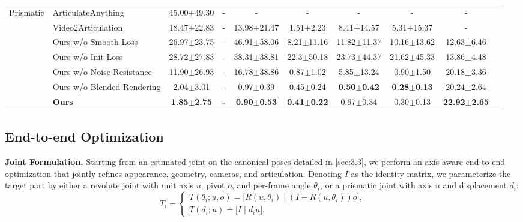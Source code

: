 \begin{table}[t]
{\begin{tabular}{llcccccccc}
    \midrule
    \multirow{6}{*}{\centering Prismatic} 
    & {ArticulateAnything~\cite{articulateanything}} & 45.00$\pm$49.30 & - & - & - & - & - & - \\
    & {Video2Articulation~\cite{video2articulation}} & 18.47$\pm$22.83 & - & 13.98$\pm$21.47 & 1.51$\pm$2.23 & 8.41$\pm$14.57 & 5.31$\pm$15.37 & - \\
    & Ours w/o Smooth Loss & 26.97$\pm$23.75 & - & 46.91$\pm$58.06 & 8.21$\pm$11.16 & 11.82$\pm$11.37 & 10.16$\pm$13.62 & 12.63$\pm$6.46 \\
    & Ours w/o Init Loss & 28.72$\pm$27.83 & - & 38.31$\pm$38.81 & 22.3$\pm$50.18 & 23.73$\pm$44.37 & 21.62$\pm$45.33 & 13.86$\pm$4.48 \\
    & Ours w/o Noise Resistance & 11.90$\pm$26.93 & - & 16.78$\pm$38.86 & 0.87$\pm$1.02 & 5.85$\pm$13.24 & 0.90$\pm$1.50 & 20.18$\pm$3.36 \\
    & Ours w/o Blended Rendering & 2.04$\pm$3.01 & - & 0.97$\pm$0.39 & 0.45$\pm$0.24 & \textbf{0.50$\pm$0.42} & \textbf{0.28$\pm$0.13} & 20.24$\pm$2.64 \\
    & \textbf{Ours} & \textbf{1.85$\pm$2.75} & \textbf{-} & \textbf{0.90$\pm$0.53} & \textbf{0.41$\pm$0.22} & 0.67$\pm$0.34 & 0.30$\pm$0.13 & \textbf{22.92$\pm$2.65} \\
    \bottomrule
    \end{tabular}%
    }
    \end{table}

    
\subsection{End-to-end Optimization}
\label{sec:opt}
\noindent\textbf{Joint Formulation.} Starting from an estimated joint on the canonical poses detailed in \ref{sec:3.3}, we perform an axis-aware end-to-end optimization that jointly refines appearance, geometry, cameras, and articulation. Denoting $I$ as the identity matrix, we parameterize the target part by either a revolute joint with unit axis $u$, pivot $o$, and per-frame angle $\theta_i$, or a prismatic joint with axis $u$ and displacement $d_i$:
\[
T_i=
\begin{cases}
T(\theta_i;u,o)
= \big[R(u,\theta_i)\mid(I-R(u,\theta_i))o\big],\\[6pt]
T(d_i;u)
= \big[I\mid d_i u\big].
\end{cases}
\]


